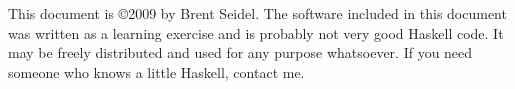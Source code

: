\documentclass[10pt, openany]{book}
\author{Brent Seidel \\ Phoenix, AZ}
\date{ \today }
\begin{document}
%
%
\frontmatter
\maketitle
This document is \copyright 2009 by Brent Seidel.  The software included in this document was written as a learning exercise and is probably not very good Haskell code.  It may be freely distributed and used for any purpose whatsoever.  If you need someone who knows a little Haskell, contact me.
\tableofcontents
\mainmatter




%
%
\end{document}
